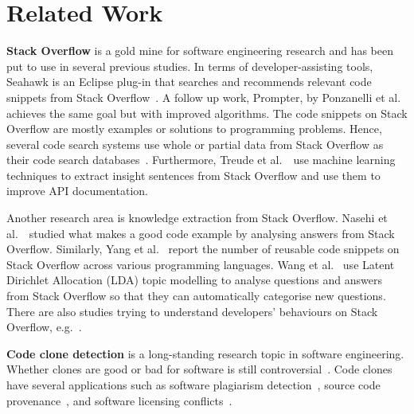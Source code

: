 \documentclass[10pt,journal,compsoc]{IEEEtran}
\begin{document}

\section{Related Work}

\textbf{Stack Overflow} is a gold mine for software engineering
research and
has been put to
use in several previous studies. In terms of developer-assisting
tools, Seahawk is an Eclipse plug-in that searches and recommends
relevant code snippets from Stack Overflow~\cite{Ponzanelli2013}. A
follow up work, Prompter, by Ponzanelli et al.~\cite{Ponzanelli2014}
achieves the same goal but with improved algorithms. The code snippets
on Stack Overflow are mostly examples or solutions to programming
problems. Hence, several code search systems use whole or partial data
from Stack Overflow as their code search
databases~\cite{Keivanloo2014,Park2014,
	Stolee2014,Subramanian2013,Diamantopoulos2015}. Furthermore, Treude
et al.~\cite{Treude2016}~use machine learning techniques to extract
insight sentences from Stack Overflow and use them to improve API
documentation.

Another research area is knowledge extraction from Stack
Overflow. Nasehi et al.~\cite{Nasehi2012}~studied what makes a good
code example by analysing answers from Stack Overflow. Similarly, Yang
et al.~\cite{Yang2016} report the number of reusable code snippets on
Stack Overflow across various programming languages. Wang et
al.~\cite{Wang2013_StackOverflow} use Latent Dirichlet Allocation
(LDA) topic modelling to analyse questions and answers from Stack
Overflow so that they can automatically categorise new
questions. There are also studies trying to understand developers'
behaviours on Stack Overflow,
e.g.~\cite{Movshovitz-Attias2013,Rosen2016,Choetkiertikul2015,Bosu2013}.

\textbf{Code clone detection} is a long-standing research topic in
software engineering. Whether clones are good or bad for software is
still
controversial~\cite{Sajnani2016,Kapser2003,Kapser2008,Krinke2008,Hotta2010,Gode2011,Harder2013}.
Code clones have several
applications such as software plagiarism
detection~\cite{Prechelt2002}, source code
provenance~\cite{Davies2013}, and software licensing
conflicts~\cite{German2009}.
\end{document}
